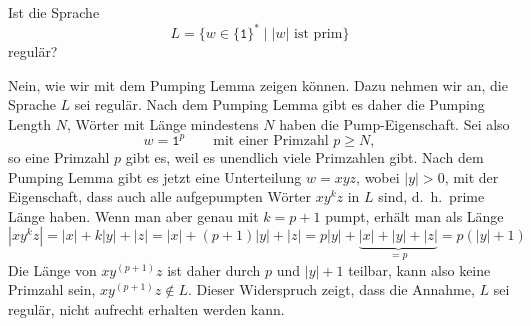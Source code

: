Ist die Sprache
\[
L=\{w\in\{\texttt{1}\}^*\;|\;\text{$|w|$ ist prim}\}
\]
regulär?

\begin{loesung}
Nein, wie wir mit dem Pumping Lemma zeigen können.
Dazu nehmen wir an, die Sprache $L$ sei regulär.
Nach dem Pumping Lemma gibt es daher die Pumping Length $N$, Wörter
mit Länge mindestens $N$ haben die Pump-Eigenschaft.
Sei also 
\[
w=\texttt{1}^p\qquad\text{mit einer Primzahl $p\ge N$},
\]
so eine Primzahl $p$ gibt es, weil es unendlich viele Primzahlen gibt.
Nach dem Pumping Lemma gibt es jetzt eine Unterteilung $w=xyz$, wobei
$|y|>0$, mit der Eigenschaft, dass auch alle aufgepumpten Wörter
$xy^kz$ in $L$ sind, d.~h.~prime Länge haben.
Wenn man aber genau mit $k=p+1$ pumpt, erhält man als Länge
\[
|xy^kz|
=
|x| + k|y| + |z|
=
|x| + (p+1)|y| + |z|
=
p|y| + \underbrace{|x|+|y|+|z|}_{\textstyle=p}
=
p(|y|+1)
\]
Die Länge von $xy^{(p+1)}z$ ist daher durch $p$ und $|y|+1$ teilbar, kann also
keine Primzahl sein, $xy^{(p+1)}z\not\in L$.
Dieser Widerspruch zeigt, dass die Annahme, $L$ sei regulär, nicht
aufrecht erhalten werden kann.
\end{loesung}


